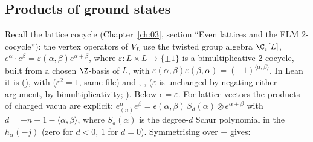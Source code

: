 \subsection{Products of ground states}

Recall the lattice cocycle (Chapter~\ref{ch:03}, section ``Even lattices and the FLM 2-cocycle''): the vertex operators
of $V_L$ use the twisted group algebra $\C_\varepsilon[L]$, $e^\alpha\cdot e^\beta=\varepsilon(\alpha,\beta)e^{\alpha+\beta}$,
where $\varepsilon:L\times L\to\{\pm1\}$ is a bimultiplicative 2-cocycle, built from a chosen $\Z$-basis of $L$,
with $\varepsilon(\alpha,\beta)\varepsilon(\beta,\alpha)=(-1)^{\langle\alpha,\beta\rangle}$.  In Lean it is
 (), with 
($\varepsilon^2=1$, same file) and , ,
 ($\varepsilon$ is unchanged by negating either argument, by bimultiplicativity;
).  Below $\epsilon=\varepsilon$.  For lattice vectors the
products of charged vacua are explicit:
$e^\alpha_{(n)}e^\beta=\epsilon(\alpha,\beta)\,S_d(\alpha)\otimes e^{\alpha+\beta}$ with
$d=-n-1-\langle\alpha,\beta\rangle$, where $S_d(\alpha)$ is the degree-$d$ Schur polynomial in the
$h_\alpha(-j)$ (zero for $d<0$, $1$ for $d=0$).  Symmetrising over $\pm$ gives:


